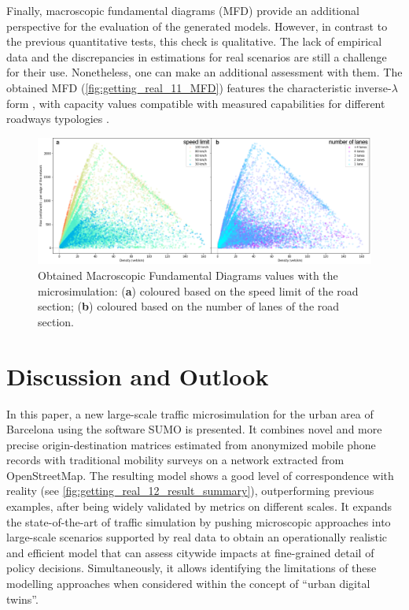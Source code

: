 Finally, macroscopic fundamental diagrams (MFD) \citep{Geroliminis2008} provide an additional perspective for the evaluation of the generated models. However, in contrast to the previous quantitative tests, this check is qualitative. The lack of empirical data and the discrepancies in estimations for real scenarios \citep{Ambuhl2017} are still a challenge for their use. Nonetheless, one can make an additional assessment with them. The obtained MFD (\autoref{fig:getting_real_11_MFD}) features the characteristic inverse-$\lambda$ form \citep{Treiber2013}, with capacity values compatible with measured capabilities for different roadways typologies \citep{Hall1996}.

\begin{figure}[htbp!]
    \centering
    \includegraphics[width=1\textwidth]{fig_11.png}
    \caption{Obtained Macroscopic Fundamental Diagrams values with the microsimulation: (\textbf{a}) coloured based on the speed limit of the road section; (\textbf{b}) coloured based on the number of lanes of the road section.}
   \label{fig:getting_real_11_MFD}
\end{figure}

\section{Discussion and Outlook}
\label{sec:GR_4_dis}

In this paper, a new large-scale traffic microsimulation for the urban area of Barcelona using the software SUMO is presented. It combines novel and more precise origin-destination matrices estimated from anonymized mobile phone records with traditional mobility surveys on a network extracted from OpenStreetMap. The resulting model shows a good level of correspondence with reality (see \autoref{fig:getting_real_12_result_summary}), outperforming previous examples, after being widely validated by metrics on different scales. It expands the state-of-the-art of traffic simulation by pushing microscopic approaches into large-scale scenarios supported by real data to obtain an operationally realistic and efficient model that can assess citywide impacts at fine-grained detail of policy decisions. Simultaneously, it allows identifying the limitations of these modelling approaches when considered within the concept of “urban digital twins”.

